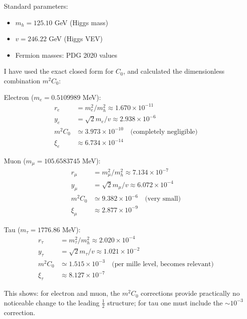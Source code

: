 \documentclass[12pt,a4paper]{report}
\begin{document}
	\begin{numerical}
		Standard parameters:
		\begin{itemize}
			\item $m_h = 125.10$ GeV (Higgs mass)
			\item $v = 246.22$ GeV (Higgs VEV)
			\item Fermion masses: PDG 2020 values
		\end{itemize}
		
		I have used the exact closed form for $C_0$, and calculated the dimensionless combination $m^2C_0$:
		
		Electron ($m_e = 0.5109989$ MeV):
		\begin{align}
			r_e &= m_e^2/m_h^2 \approx 1.670 \times 10^{-11}\\
			y_e &= \sqrt{2} m_e/v \approx 2.938 \times 10^{-6}\\
			m^2C_0 &\simeq 3.973 \times 10^{-10} \quad \text{(completely negligible)}\\
			\xi_e &\approx 6.734 \times 10^{-14}
		\end{align}
		
		Muon ($m_\mu = 105.6583745$ MeV):
		\begin{align}
			r_\mu &= m_\mu^2/m_h^2 \approx 7.134 \times 10^{-7}\\
			y_\mu &= \sqrt{2} m_\mu/v \approx 6.072 \times 10^{-4}\\
			m^2C_0 &\simeq 9.382 \times 10^{-6} \quad \text{(very small)}\\
			\xi_\mu &\approx 2.877 \times 10^{-9}
		\end{align}
		
		Tau ($m_\tau = 1776.86$ MeV):
		\begin{align}
			r_\tau &= m_\tau^2/m_h^2 \approx 2.020 \times 10^{-4}\\
			y_\tau &= \sqrt{2} m_\tau/v \approx 1.021 \times 10^{-2}\\
			m^2C_0 &\simeq 1.515 \times 10^{-3} \quad \text{(per mille level, becomes relevant)}\\
			\xi_\tau &\approx 8.127 \times 10^{-7}
		\end{align}
		
		This shows: for electron and muon, the $m^2C_0$ corrections provide practically no noticeable change to the leading $\frac{1}{2}$ structure; for tau one must include the $\sim 10^{-3}$ correction.
	\end{numerical}
	
\end{document}
